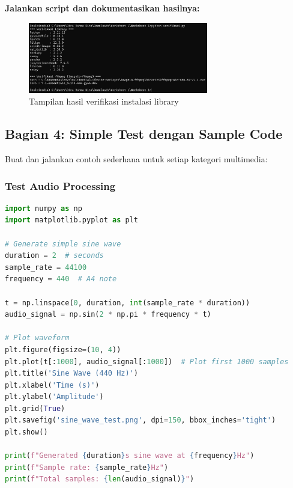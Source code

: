 \documentclass[11pt,a4paper]{article}
\begin{document}
\textbf{Jalankan script dan dokumentasikan hasilnya:}

\begin{figure}[H]
    \centering
    \includegraphics[width=0.7\textwidth]{Figure/ss/11.png}
    \caption{Tampilan hasil verifikasi instalasi library}
    \label{fig:library_verification}
\end{figure}


\subsection{Bagian 4: Simple Test dengan Sample Code}
Buat dan jalankan contoh sederhana untuk setiap kategori multimedia:

\subsubsection{Test Audio Processing}
\begin{lstlisting}[language=Python, caption=Test audio processing sederhana]
import numpy as np
import matplotlib.pyplot as plt

# Generate simple sine wave
duration = 2  # seconds
sample_rate = 44100
frequency = 440  # A4 note

t = np.linspace(0, duration, int(sample_rate * duration))
audio_signal = np.sin(2 * np.pi * frequency * t)

# Plot waveform
plt.figure(figsize=(10, 4))
plt.plot(t[:1000], audio_signal[:1000])  # Plot first 1000 samples
plt.title('Sine Wave (440 Hz)')
plt.xlabel('Time (s)')
plt.ylabel('Amplitude')
plt.grid(True)
plt.savefig('sine_wave_test.png', dpi=150, bbox_inches='tight')
plt.show()

print(f"Generated {duration}s sine wave at {frequency}Hz")
print(f"Sample rate: {sample_rate}Hz")
print(f"Total samples: {len(audio_signal)}")
\end{lstlisting}
\end{document}
